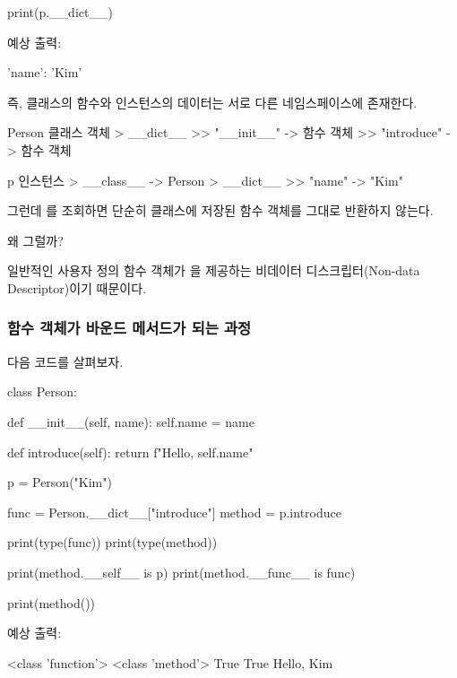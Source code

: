 \begin{dhkcode}
print(p.__dict__)
\end{dhkcode}

예상 출력:

\begin{dhkzsh}
{'name': 'Kim'}
\end{dhkzsh}

즉, 클래스의 함수와 인스턴스의 데이터는 서로 다른 네임스페이스에 존재한다.

\begin{dhkdir}[in=6]
Person 클래스 객체
> __dict__
>> "__init__" -> 함수 객체
>> "introduce" -> 함수 객체
\end{dhkdir}

\begin{dhkdir}[in=6]
p 인스턴스
> __class__ -> Person
> __dict__
>> "name" -> "Kim"
\end{dhkdir}

그런데 를 조회하면 단순히 클래스에 저장된 함수 객체를 그대로 반환하지 않는다.

왜 그럴까?

일반적인 사용자 정의 함수 객체가 을 제공하는 비데이터 디스크립터(Non-data Descriptor)이기 때문이다.

\subsubsection{함수 객체가 바운드 메서드가 되는 과정}

다음 코드를 살펴보자.

\begin{dhkcode}
class Person:

    def __init__(self, name):
        self.name = name

    def introduce(self):
        return f"Hello, {self.name}"


p = Person("Kim")

func = Person.__dict__["introduce"]
method = p.introduce

print(type(func))
print(type(method))

print(method.__self__ is p)
print(method.__func__ is func)

print(method())
\end{dhkcode}

예상 출력:

\begin{dhkzsh}
<class 'function'>
<class 'method'>
True
True
Hello, Kim
\end{dhkzsh}

